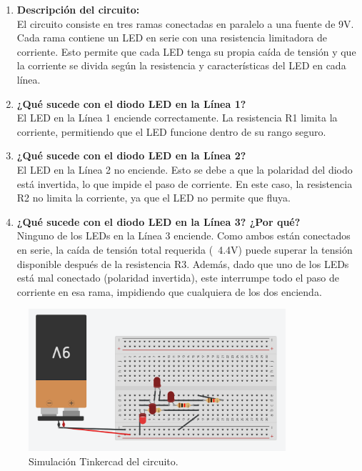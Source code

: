 \documentclass{article}
\begin{document}
\begin{enumerate}
    \item \textbf{Descripción del circuito:} \\
    El circuito consiste en tres ramas conectadas en paralelo a una fuente de 9V. Cada rama contiene un LED en serie con una resistencia limitadora de corriente. Esto permite que cada LED tenga su propia caída de tensión y que la corriente se divida según la resistencia y características del LED en cada línea.

    \item \textbf{¿Qué sucede con el diodo LED en la Línea 1?} \\
    El LED en la Línea 1 enciende correctamente. La resistencia R1 limita la corriente, permitiendo que el LED funcione dentro de su rango seguro.

    \item \textbf{¿Qué sucede con el diodo LED en la Línea 2?} \\
    El LED en la Línea 2 no enciende. Esto se debe a que la polaridad del diodo está invertida, lo que impide el paso de corriente. En este caso, la resistencia R2 no limita la corriente, ya que el LED no permite que fluya.

    \item \textbf{¿Qué sucede con el diodo LED en la Línea 3? ¿Por qué?} \\
    Ninguno de los LEDs en la Línea 3 enciende. Como ambos están conectados en serie, la caída de tensión total requerida (~4.4V) puede superar la tensión disponible después de la resistencia R3. Además, dado que uno de los LEDs está mal conectado (polaridad invertida), este interrumpe todo el paso de corriente en esa rama, impidiendo que cualquiera de los dos encienda.
\end{enumerate}

\begin{figure}[H]
    \centering
    \includegraphics[width=0.85\textwidth]{./img/ckpt_2_3_1.png}
    \caption{Simulación Tinkercad del circuito.}
    \label{fig:simulacion_implementacion}
\end{figure}
\end{document}
